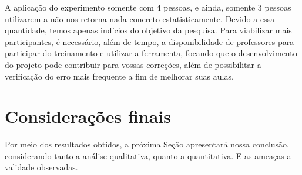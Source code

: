 		A aplicação do experimento somente com $4$ pessoas, e ainda, somente $3$ pessoas
		utilizarem a  não nos retorna nada concreto estatisticamente.
		Devido a essa quantidade, temos apenas indícios do objetivo da pesquisa. Para
		viabilizar mais participantes, é necessário, além de tempo, a disponibilidade
		de professores para participar do treinamento e utilizar a ferramenta, focando
		que o desenvolvimento do projeto pode contribuir para vossas correções, além
		de possibilitar a verificação do erro mais frequente a fim de melhorar suas
		aulas.

	\section{Considerações finais}
	
		Por meio dos resultados obtidos, a próxima Seção apresentará nossa conclusão,
		considerando tanto a análise qualitativa, quanto a quantitativa. E as ameaças
		a validade observadas.
